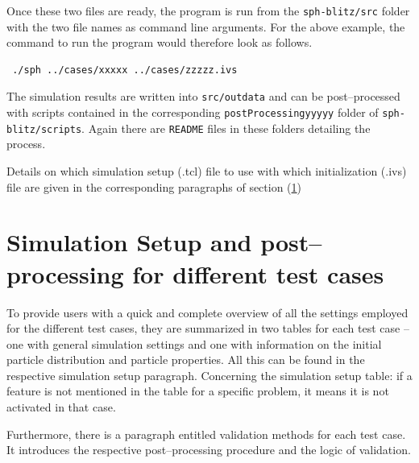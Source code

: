 \documentclass{report}
\begin{document}
Once these two files are ready, the program is run from the {\tt sph-blitz/src} folder with the two file names as command line arguments. For the above example, the command to run the program would therefore look as follows.
\begin{verbatim}
 ./sph ../cases/xxxxx ../cases/zzzzz.ivs
\end{verbatim}
The simulation results are written into {\tt src/outdata} and can be post--processed with scripts contained in the corresponding {\tt postProcessingyyyyy} folder of {\tt sph-blitz/scripts}. Again there are {\tt README} files in these folders detailing the process.

Details on which simulation setup (.tcl) file to use with which initialization (.ivs) file are given in the corresponding paragraphs of section (\ref{sec:simuSetupTestCases})


\section{Simulation Setup and post--processing for different test cases}
\label{sec:simuSetupTestCases}
To provide users with a quick and complete overview of all the settings employed for the different test cases, they are summarized in two tables for each test case -- one with general simulation settings and one with information on the initial particle distribution and particle properties. All this can be found in the respective simulation setup paragraph. 
Concerning the simulation setup table: if a feature is not mentioned in the table for a specific problem, it means it is not activated in that case. 

Furthermore, there is a paragraph entitled validation methods for each test case. It introduces the respective post--processing procedure and the logic of validation. 
\end{document}
